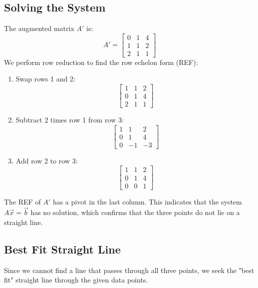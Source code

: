 \documentclass{report}
\begin{document}
\subsection{Solving the System}

The augmented matrix $A'$ is:
\[
	A' = \begin{bmatrix}
		0 & 1 & 4 \\
		1 & 1 & 2 \\
		2 & 1 & 1
	\end{bmatrix}
\]
We perform row reduction to find the row echelon form (REF):

\begin{enumerate}
	\item Swap rows 1 and 2:
	      \[
		      \begin{bmatrix}
			      1 & 1 & 2 \\
			      0 & 1 & 4 \\
			      2 & 1 & 1
		      \end{bmatrix}
	      \]
	\item Subtract 2 times row 1 from row 3:
	      \[
		      \begin{bmatrix}
			      1 & 1  & 2  \\
			      0 & 1  & 4  \\
			      0 & -1 & -3
		      \end{bmatrix}
	      \]
	\item Add row 2 to row 3:
	      \[
		      \begin{bmatrix}
			      1 & 1 & 2 \\
			      0 & 1 & 4 \\
			      0 & 0 & 1
		      \end{bmatrix}
	      \]
\end{enumerate}

The REF of $A'$ has a pivot in the last column. This indicates that the system $A\vec{x} = \vec{b}$ has no solution, which confirms that the three points do not lie on a straight line.

\subsection{Best Fit Straight Line}

Since we cannot find a line that passes through all three points, we seek the "best fit" straight line through the given data points.

\end{document}
